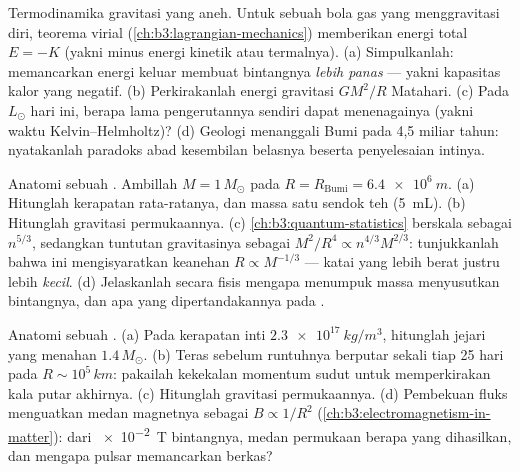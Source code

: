 \begin{exercise}[$\star\star$]\label{exo:b3:astrophysics:5}
Termodinamika gravitasi yang aneh. Untuk sebuah bola gas yang
menggravitasi diri, teorema virial (\cref{ch:b3:lagrangian-mechanics})
memberikan energi total $E = -K$ (yakni minus energi kinetik atau termalnya).
(a) Simpulkanlah: memancarkan energi keluar membuat bintangnya \emph{lebih panas}
--- yakni kapasitas kalor yang negatif. (b) Perkirakanlah energi
gravitasi $GM^2/R$ Matahari. (c) Pada $L_\odot$ hari ini, berapa lama
pengerutannya sendiri dapat menenagainya (yakni waktu
Kelvin--Helmholtz)? (d) Geologi menanggali Bumi pada 4,5 miliar tahun: nyatakanlah
paradoks abad kesembilan belasnya beserta penyelesaian intinya.
\end{exercise}

\begin{exercise}[$\star\star$]\label{exo:b3:astrophysics:6}
Anatomi sebuah . Ambillah $M = 1\,M_\odot$ pada
$R = R_{\text{Bumi}} = \qty{6.4e6}{m}$. (a) Hitunglah kerapatan
rata-ratanya, dan massa satu sendok teh (\qty{5}{mL}). (b) Hitunglah
gravitasi permukaannya. (c) 
\cref{ch:b3:quantum-statistics} berskala sebagai $n^{5/3}$, sedangkan tuntutan gravitasinya
sebagai $M^2/R^4 \propto n^{4/3}M^{2/3}$: tunjukkanlah bahwa ini mengisyaratkan
keanehan $R \propto M^{-1/3}$ --- katai yang lebih berat justru lebih
\emph{kecil}. (d) Jelaskanlah secara fisis mengapa menumpuk massa
menyusutkan bintangnya, dan apa yang dipertandakannya pada .
\end{exercise}

\begin{exercise}[$\star\star$]\label{exo:b3:astrophysics:7}
Anatomi sebuah . (a) Pada kerapatan inti
$\qty{2.3e17}{kg/m^3}$, hitunglah jejari yang menahan
$1.4\,M_\odot$. (b) Teras sebelum runtuhnya berputar sekali tiap 25 hari
pada $R \sim 10^5\,\unit{km}$: pakailah kekekalan momentum sudut
untuk memperkirakan kala putar akhirnya. (c) Hitunglah gravitasi
permukaannya. (d) Pembekuan fluks menguatkan medan magnetnya sebagai
$B \propto 1/R^2$ (\cref{ch:b3:electromagnetism-in-matter}):
dari \qty{e-2}{T} bintangnya, medan permukaan berapa yang dihasilkan, dan
mengapa pulsar memancarkan berkas?
\end{exercise}

